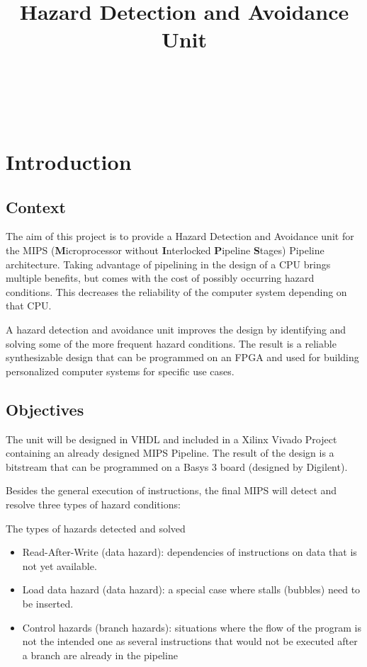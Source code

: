 \documentclass[a4paper,12pt]{report}
\title{\textbf{Hazard Detection and Avoidance Unit}}
\author{
    \IEEEauthorblockN{Student: Radu-Augustin Vele} \\\\
    \hline\\
    \IEEEauthorblockA{{Structure of Computer Systems Project} \\ \\
    \hline \\
    {Technical University of Cluj-Napoca}}}
\begin{document}
\maketitle

\newpage

\tableofcontents


\newpage


\chapter{Introduction}
\section{Context} 

The aim of this project is to provide a Hazard Detection and Avoidance unit for the MIPS (\textbf{M}icroprocessor without \textbf{I}nterlocked \textbf{P}ipeline \textbf{S}tages) Pipeline architecture. Taking advantage of pipelining in the design of a CPU brings multiple benefits, but comes with the cost of possibly occurring hazard conditions. This decreases the reliability of the computer system depending on that CPU.


A hazard detection and avoidance unit improves the design by identifying and solving some of the more frequent hazard conditions. The result is a reliable synthesizable design that can be programmed on an FPGA and used for building personalized computer systems for specific use cases.
 
\section{Objectives}

The unit will be designed in VHDL and included in a Xilinx Vivado Project containing an already designed MIPS Pipeline. The result of the design is a bitstream that can be programmed on a Basys 3 board (designed by Digilent). 

Besides the general execution of instructions, the final MIPS will detect and resolve three types of hazard conditions:

\begin{my-list}{The types of hazards detected and solved}
    \begin{itemize}
        \item Read-After-Write (data hazard): dependencies of instructions on data that is not yet available.
        \item Load data hazard (data hazard): a special case where stalls (bubbles) need to be inserted.
        \item Control hazards (branch hazards): situations where the flow of the program is not the intended one as several instructions that would not be executed after a branch are already in the pipeline
    \end{itemize}
\end{my-list}
\end{document}
